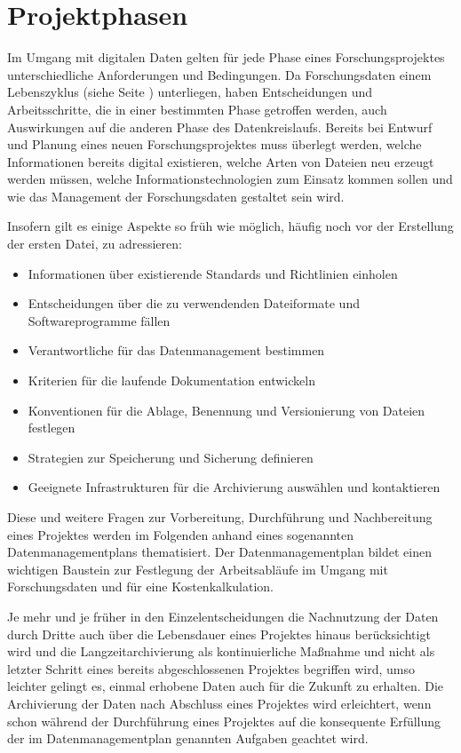 \chapter{Projektphasen}
	\label{projektphasen}

Im Umgang mit digitalen Daten gelten für jede Phase eines Forschungsprojektes unterschiedliche Anforderungen und Bedingungen. Da Forschungsdaten einem Lebenszyklus (siehe Seite \pageref{lebenszyklus}) unterliegen, haben Entscheidungen und Arbeitsschritte, die in einer bestimmten Phase getroffen werden, auch Auswirkungen auf die anderen Phase des Datenkreislaufs. Bereits bei Entwurf und Planung eines neuen Forschungsprojektes muss überlegt werden, welche Informationen bereits digital existieren, welche Arten von Dateien neu erzeugt werden müssen, welche Informationstechnologien zum Einsatz kommen sollen und wie das Management der Forschungsdaten gestaltet sein wird. 

Insofern gilt es einige Aspekte so früh wie möglich, häufig noch vor der Erstellung der ersten Datei, zu adressieren:
\begin{itemize}
\item Informationen über existierende Standards und Richtlinien einholen
\item Entscheidungen über die zu verwendenden Dateiformate und Softwareprogramme fällen
\item Verantwortliche für das Datenmanagement bestimmen
\item Kriterien für die laufende Dokumentation entwickeln
\item Konventionen für die Ablage, Benennung und Versionierung von Dateien festlegen
\item Strategien zur Speicherung und Sicherung definieren
\item Geeignete Infrastrukturen für die Archivierung auswählen und kontaktieren
\end{itemize}

Diese und weitere Fragen zur Vorbereitung, Durchführung und Nachbereitung eines Projektes werden im Folgenden anhand eines sogenannten Datenmanagementplans thematisiert. Der Datenmanagementplan bildet einen wichtigen Baustein zur Festlegung der Arbeitsabläufe im Umgang mit Forschungsdaten und für eine Kostenkalkulation.

Je mehr und je früher in den Einzelentscheidungen die Nachnutzung der Daten durch Dritte auch über die Lebensdauer eines Projektes hinaus berücksichtigt wird und die Langzeitarchivierung als kontinuierliche Maßnahme und nicht als letzter Schritt eines bereits abgeschlossenen Projektes begriffen wird, umso leichter gelingt es, einmal erhobene Daten auch für die Zukunft zu erhalten. Die Archivierung der Daten nach Abschluss eines Projektes wird erleichtert, wenn schon während der Durchführung eines Projektes auf die konsequente Erfüllung der im Datenmanagementplan genannten Aufgaben geachtet wird.

